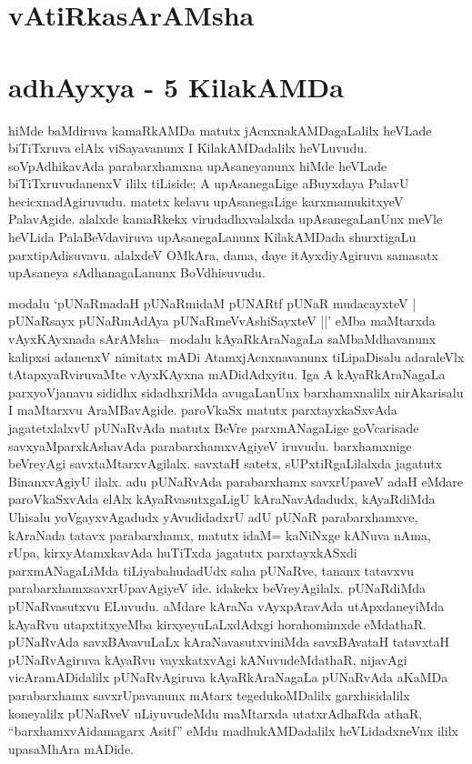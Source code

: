 
\begin{center}
\section*{vAtiRkasArAMsha}
\section*{adhAyxya - 5 KilakAMDa}
\end{center}

\begin{artha}
hiMde baMdiruva kamaRkAMDa matutx jAcnxnakAMDagaLalilx heVLade biTiTxruva elAlx viSayavanunx I KilakAMDadalilx heVLuvudu. soVpAdhikavAda parabarxhamxna upAsaneyanunx hiMde heVLade biTiTxruvudanenxV ililx tiLiside; A upAsanegaLige aBuyxdaya PalavU hecicxnadAgiruvudu. matetx kelavu upAsanegaLige karxmamukitxyeV PalavAgide. alalxde kamaRkekx virudadhxvalalxda upAsanegaLanUnx meVle heVLida PalaBeVdaviruva upAsanegaLanunx KilakAMDada shurxtigaLu parxtipAdisuvavu. alalxdeV OMkAra, dama, daye itAyxdiyAgiruva samasatx upAsaneya sAdhanagaLanunx BoVdhisuvudu.
\end{artha}


\begin{artha}
modalu `pUNaRmadaH pUNaRmidaM pUNARtf pUNaR mudacayxteV |
pUNaRsayx pUNaRmAdAya pUNaRmeVvAshiSayxteV ||'
eMba maMtarxda vAyxKAyxnada sArAMsha{\rm --} modalu kAyaRkAraNagaLa saMbaMdhavanunx kalipxsi adanenxV nimitatx mADi AtamxjAcnxnavanunx tiLipaDisalu adaraleVlx tAtapxyaRviruvaMte vAyxKAyxna mADidAdxyitu. Iga A kAyaRkAraNagaLa parxyoVjanavu sididhx sidadhxriMda avugaLanUnx barxhamxnalilx nirAkarisalu I maMtarxvu AraMBavAgide. paroVkaSx matutx parxtayxkaSxvAda jagatetxlalxvU pUNaRvAda matutx BeVre parxmANagaLige goVcarisade savxyaMparxkAshavAda parabarxhamxvAgiyeV iruvudu. barxhamxnige beVreyAgi savxtaMtarxvAgilalx. savxtaH satetx, sUPxtiRgaLilalxda jagatutx BinanxvAgiyU ilalx. adu pUNaRvAda parabarxhamx savxrUpaveV adaH eMdare paroVkaSxvAda elAlx kAyaRvasutxgaLigU kAraNavAdadudx, kAyaRdiMda Uhisalu yoVgayxvAgadudx yAvudidadxrU adU pUNaR parabarxhamxve, kAraNada tatavx parabarxhamx, matutx idaM= kaNiNxge kANuva nAma, rUpa, kirxyAtamxkavAda huTiTxda jagatutx parxtayxkASxdi parxmANagaLiMda tiLiyabahudadUdx saha pUNaRve, tananx tatavxvu parabarxhamxsavxrUpavAgiyeV ide. idakekx beVreyAgilalx. pUNaRdiMda pUNaRvasutxvu ELuvudu. aMdare kAraNa vAyxpAravAda utApxdaneyiMda kAyaRvu utapxtitxyeMba kirxyeyuLaLxdAdxgi horahomimxde eMdathaR. pUNaRvAda savxBAvavuLaLx kAraNavasutxviniMda savxBAvataH tatavxtaH pUNaRvAgiruva kAyaRvu vayxkatxvAgi kANuvudeMdathaR, nijavAgi vicAramADidalilx pUNaRvAgiruva kAyaRkAraNagaLa pUNaRvAda aKaMDa parabarxhamx savxrUpavanunx mAtarx tegedukoMDalilx garxhisidalilx koneyalilx pUNaRveV uLiyuvudeMdu maMtarxda utatxrAdhaRda athaR, ``barxhamxvAidamagarx Asitf'' eMdu madhukAMDadalilx heVLidadxneVnx ililx upasaMhAra mADide.
\end{artha}

